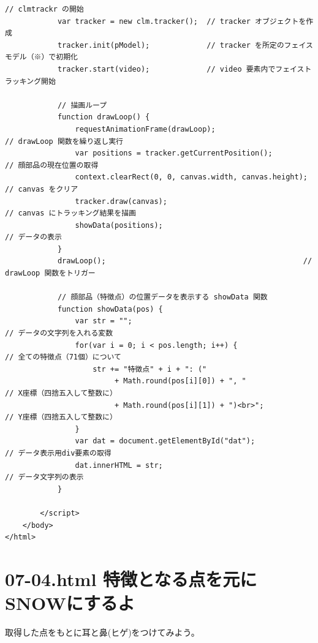 \documentclass[mingoth,11pt,a4j,uplatex]{jsarticle}
\begin{document}
\begin{lstlisting}[caption=07-03.html]
            // clmtrackr の開始
            var tracker = new clm.tracker();  // tracker オブジェクトを作成
            tracker.init(pModel);             // tracker を所定のフェイスモデル（※）で初期化
            tracker.start(video);             // video 要素内でフェイストラッキング開始

            // 描画ループ
            function drawLoop() {
                requestAnimationFrame(drawLoop);                      // drawLoop 関数を繰り返し実行
                var positions = tracker.getCurrentPosition();         // 顔部品の現在位置の取得
                context.clearRect(0, 0, canvas.width, canvas.height); // canvas をクリア
                tracker.draw(canvas);                                 // canvas にトラッキング結果を描画
                showData(positions);                                  // データの表示
            }
            drawLoop();                                             // drawLoop 関数をトリガー
            
            // 顔部品（特徴点）の位置データを表示する showData 関数
            function showData(pos) {
                var str = "";                                         // データの文字列を入れる変数
                for(var i = 0; i < pos.length; i++) {                 // 全ての特徴点（71個）について
                    str += "特徴点" + i + ": ("
                         + Math.round(pos[i][0]) + ", "                 // X座標（四捨五入して整数に）
                         + Math.round(pos[i][1]) + ")<br>";             // Y座標（四捨五入して整数に）
                }
                var dat = document.getElementById("dat");             // データ表示用div要素の取得
                dat.innerHTML = str;                                  // データ文字列の表示
            }

        </script>
    </body>
</html>
\end{lstlisting}

\newpage
\section{07-04.html 特徴となる点を元にSNOWにするよ}
取得した点をもとに耳と鼻(ヒゲ)をつけてみよう。
\end{document}
